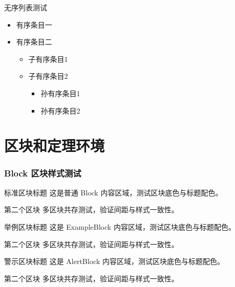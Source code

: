\begin{frame}{无序列表测试}
    \begin{itemize}
        \item 有序条目一
        \item 有序条目二
            \begin{itemize}
                \item 子有序条目1
                \item 子有序条目2
                    \begin{itemize}
                        \item 孙有序条目1
                        \item 孙有序条目2
                    \end{itemize}
            \end{itemize}
    \end{itemize}
\end{frame}


\section{区块和定理环境}
\begin{frame}
    \frametitle{Block 区块样式测试}
    \begin{block}{标准区块标题}
        这是普通 Block 内容区域，测试区块底色与标题配色。
    \end{block}

    \begin{block}{第二个区块}
        多区块共存测试，验证间距与样式一致性。
    \end{block}

    \begin{exampleblock}{举例区块标题}
        这是 ExampleBlock 内容区域，测试区块底色与标题配色。
    \end{exampleblock}

    \begin{exampleblock}{第二个区块}
        多区块共存测试，验证间距与样式一致性。
    \end{exampleblock}

    \begin{alertblock}{警示区块标题}
        这是 AlertBlock 内容区域，测试区块底色与标题配色。
    \end{alertblock}

    \begin{alertblock}{第二个区块}
        多区块共存测试，验证间距与样式一致性。
    \end{alertblock}
\end{frame}

